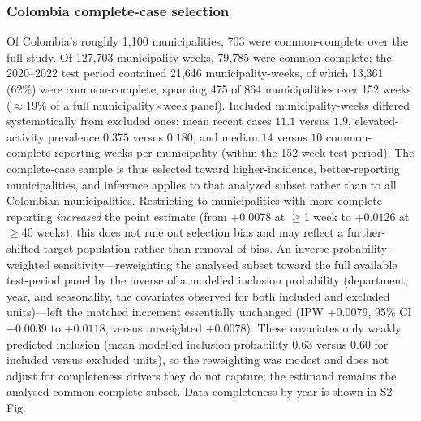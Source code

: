 \documentclass[11pt,a4paper]{article}
\begin{document}
\subsubsection*{Colombia complete-case selection}
Of Colombia's roughly 1{,}100 municipalities, 703 were common-complete over the full study. Of 127{,}703 municipality-weeks, 79{,}785 were common-complete; the 2020--2022 test period contained 21{,}646 municipality-weeks, of which 13{,}361 (62\%) were common-complete, spanning 475 of 864 municipalities over 152 weeks ($\approx$19\% of a full municipality$\times$week panel). Included municipality-weeks differed systematically from excluded ones: mean recent cases $11.1$ versus $1.9$, elevated-activity prevalence $0.375$ versus $0.180$, and median $14$ versus $10$ common-complete reporting weeks per municipality (within the 152-week test period). The complete-case sample is thus selected toward higher-incidence, better-reporting municipalities, and inference applies to that analyzed subset rather than to all Colombian municipalities. Restricting to municipalities with more complete reporting \emph{increased} the point estimate (from $+0.0078$ at $\geq$1 week to $+0.0126$ at $\geq$40 weeks); this does not rule out selection bias and may reflect a further-shifted target population rather than removal of bias. An inverse-probability-weighted sensitivity---reweighting the analysed subset toward the full available test-period panel by the inverse of a modelled inclusion probability (department, year, and seasonality, the covariates observed for both included and excluded units)---left the matched increment essentially unchanged (IPW $+0.0079$, 95\% CI $+0.0039$ to $+0.0118$, versus unweighted $+0.0078$). These covariates only weakly predicted inclusion (mean modelled inclusion probability $0.63$ versus $0.60$ for included versus excluded units), so the reweighting was modest and does not adjust for completeness drivers they do not capture; the estimand remains the analysed common-complete subset. Data completeness by year is shown in S2 Fig.
\end{document}
